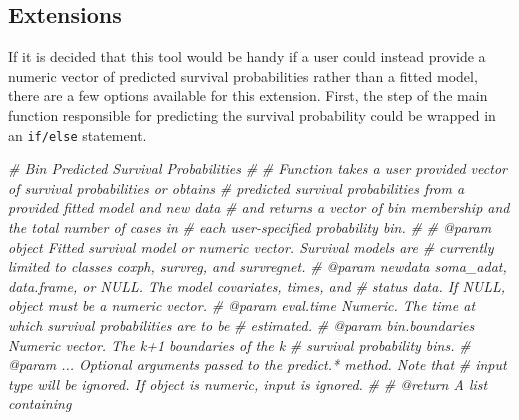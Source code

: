\documentclass[
]{book}
\newenvironment{Shaded}{\begin{snugshade}}{\end{snugshade}}
\newcommand{\CommentTok}[1]{\textcolor[rgb]{0.56,0.35,0.01}{\textit{#1}}}
\begin{document}
\hypertarget{extensions-1}{%
\subsection{Extensions}\label{extensions-1}}

If it is decided that this tool would be handy if a user could instead provide a numeric vector of predicted survival probabilities rather than a fitted model, there are a few options available for this extension. First, the step of the main function responsible for predicting the survival probability could be wrapped in an \texttt{if/else} statement.

\begin{Shaded}
\begin{Highlighting}[]
\CommentTok{\#\textquotesingle{} Bin Predicted Survival Probabilities}
\CommentTok{\#\textquotesingle{} }
\CommentTok{\#\textquotesingle{} Function takes a user provided vector of survival probabilities or obtains}
\CommentTok{\#\textquotesingle{}   predicted survival probabilities from a provided fitted model and new data}
\CommentTok{\#\textquotesingle{}   and returns a vector of bin membership and the total number of cases in}
\CommentTok{\#\textquotesingle{}   each user{-}specified probability bin.}
\CommentTok{\#\textquotesingle{}   }
\CommentTok{\#\textquotesingle{} @param object Fitted survival model or numeric vector. Survival models are }
\CommentTok{\#\textquotesingle{}   currently limited to classes \textasciigrave{}coxph\textasciigrave{}, \textasciigrave{}survreg\textasciigrave{}, and \textasciigrave{}survregnet\textasciigrave{}.}
\CommentTok{\#\textquotesingle{} @param newdata soma\_adat, data.frame, or NULL. The model covariates, times, and}
\CommentTok{\#\textquotesingle{}   status data. If NULL, \textasciigrave{}object\textasciigrave{} must be a numeric vector.}
\CommentTok{\#\textquotesingle{} @param eval.time Numeric. The time at which survival probabilities are to be}
\CommentTok{\#\textquotesingle{}   estimated.}
\CommentTok{\#\textquotesingle{} @param bin.boundaries Numeric vector. The k+1 boundaries of the k}
\CommentTok{\#\textquotesingle{}   survival probability bins.}
\CommentTok{\#\textquotesingle{} @param ... Optional arguments passed to the \textasciigrave{}predict.*\textasciigrave{} method. Note that}
\CommentTok{\#\textquotesingle{}   input \textasciigrave{}type\textasciigrave{} will be ignored. If \textasciigrave{}object\textasciigrave{} is numeric, input is ignored.}
\CommentTok{\#\textquotesingle{} }
\CommentTok{\#\textquotesingle{} @return A list containing}

\end{Highlighting}
\end{Shaded}
\end{document}
